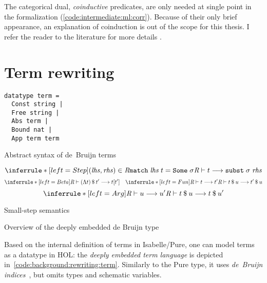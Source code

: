 
\noindent
The categorical dual, \emph{coinductive} predicates, are only needed at single point in the formalization (\cref{code:intermediate:ml:corr}).
Because of their only brief appearance, an explanation of coinduction is out of the scope for this thesis.
I refer the reader to the literature for more details \cite{sangiorgi2011coinduction,gordon1995coinduction}.

\section{Term rewriting}
\label{sec:background:rewriting}

\begin{code}
  \begin{subcode}{.3\linewidth}
    \begin{lstlisting}[language=Isabelle]
datatype term =
  Const string |
  Free string |
  Abs term |
  Bound nat |
  App term term
    \end{lstlisting}
    \caption{Abstract syntax of de~Bruijn terms}
    \label{code:background:rewriting:term}
  \end{subcode}
  \begin{subcode}{.7\linewidth}
    \[
      \inferrule*[left=Step]{(\mathit{lhs}, \mathit{rhs}) \in \R \\ \holconst{match}\;\mathit{lhs}\;t = \holconst{Some}\;\sigma}{\rewrite{\R}{t}{\holconst{subst}\;\sigma\;\mathit{rhs}}}
    \]
    \[
      \inferrule*[left=Beta]{ }{\rewrite{\R}{\app{(\Lambda t)}{t'}}{t[t']}} \quad
      \inferrule*[left=Fun]{\rewrite{\R}{t}{t'}}{\rewrite{\R}{\app t u}{\app{t'}{u}}}
    \]
    \[
      \inferrule*[left=Arg]{\rewrite{\R}{u}{u'}}{\rewrite{\R}{\app t u}{\app{t}{u'}}}
    \]
    \caption{Small-step semantics}
    \label{code:background:rewriting:semantics}
  \end{subcode}
  \caption{Overview of the deeply embedded de Bruijn  type}
\end{code}

\noindent
Based on the internal definition of terms in Isabelle/Pure, one can model terms as a datatype in HOL: the \emph{deeply embedded term language} is depicted in~\cref{code:background:rewriting:term}.
Similarly to the Pure type, it uses \emph{de~Bruijn indices}~\cite{debruijn1972lambda}, but omits types and schematic variables.


